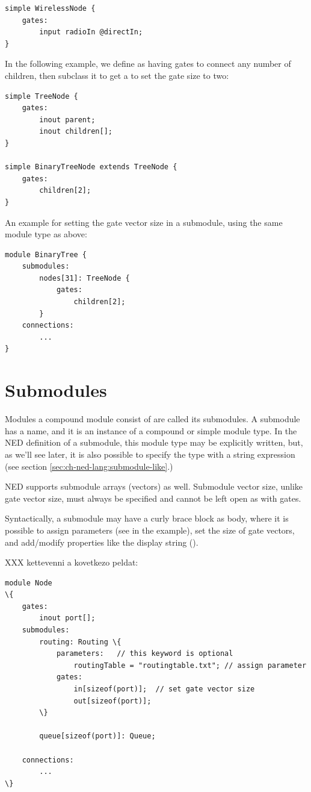 \begin{verbatim}
simple WirelessNode {
    gates:
        input radioIn @directIn;
}
\end{verbatim}

In the following example, we define  as having gates to connect
any number of children, then subclass it to get a  to
set the gate size to two:

\begin{verbatim}
simple TreeNode {
    gates:
        inout parent;
        inout children[];
}

simple BinaryTreeNode extends TreeNode {
    gates:
        children[2];
}
\end{verbatim}

An example for setting the gate vector size in a submodule, using the same
 module type as above:

\begin{verbatim}
module BinaryTree {
    submodules:
        nodes[31]: TreeNode {
            gates:
                children[2];
        }
    connections:
        ...
}
\end{verbatim}



\section{Submodules}
\label{sec:ch-ned-lang:submodules}

Modules a compound module consist of are called its submodules.
A submodule has a name, and it is an instance of a compound or simple
module type. In the NED definition of a submodule, this module type
may be explicitly written, but, as we'll see later, it is also possible
to specify the type with a string expression (see section
\ref{sec:ch-ned-lang:submodule-like}.)

NED supports submodule arrays (vectors) as well. Submodule vector size,
unlike gate vector size, must always be specified and cannot be left
open as with gates.

Syntactically, a submodule may have a curly brace block as body, where
it is possible to assign parameters (see  in the example),
set the size of gate vectors, and add/modify properties like the
display string ().

XXX kettevenni a kovetkezo peldat:
\begin{Verbatim}[commandchars=\\\{\}]
module Node
\{
    gates:
        inout port[];
    submodules:
        routing: Routing \{
            parameters:   // this keyword is optional
                routingTable = "routingtable.txt"; // assign parameter
            gates:
                in[sizeof(port)];  // set gate vector size
                out[sizeof(port)];
        \}

        queue[sizeof(port)]: Queue;

    connections:
        ...
\}
\end{Verbatim}

